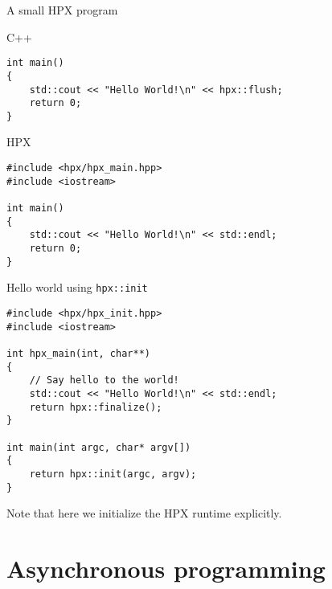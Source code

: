\documentclass[\classoption]{beamer}
\begin{document}
\begin{frame}[fragile]{A small HPX program}

\begin{block}{C++}
\begin{lstlisting}
int main()
{
    std::cout << "Hello World!\n" << hpx::flush;
    return 0;
}
\end{lstlisting}
\end{block}

\begin{block}{HPX}
\begin{lstlisting}
#include <hpx/hpx_main.hpp>
#include <iostream>

int main()
{
    std::cout << "Hello World!\n" << std::endl;
    return 0;
}
\end{lstlisting}
\end{block}

\end{frame}


\begin{frame}[fragile]{Hello world using \lstinline{hpx::init}}

\begin{lstlisting}
#include <hpx/hpx_init.hpp>
#include <iostream>

int hpx_main(int, char**)
{
    // Say hello to the world!
    std::cout << "Hello World!\n" << std::endl;
    return hpx::finalize();
}

int main(int argc, char* argv[])
{
    return hpx::init(argc, argv);
}
\end{lstlisting}
\begin{center}
Note that here we  initialize the HPX runtime explicitly.
\end{center}
\end{frame}

\section{Asynchronous programming}
\end{document}
